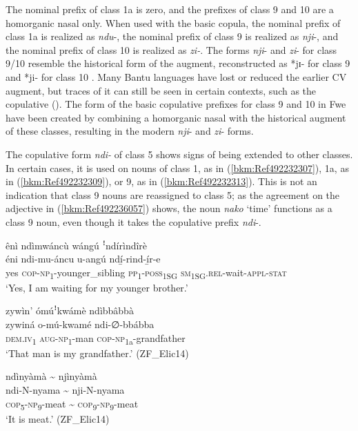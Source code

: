 The nominal prefix of class 1a is zero, and the prefixes of class 9 and 10 are a homorganic nasal only. When used with the basic copula, the nominal prefix of class 1a is realized as \textit{ndu}\nobreakdash-, the nominal prefix of class 9 is realized as \textit{nji}\nobreakdash-, and the nominal prefix of class 10 is realized as \textit{zi-}. The forms \textit{nji}\nobreakdash- and \textit{zi}\nobreakdash- for class 9/10 resemble the historical form of the augment, reconstructed as *jɪ\nobreakdash- for class 9 and *ji\nobreakdash- for class 10 \citep[99]{Meeussen1967}. Many Bantu languages have lost or reduced the earlier CV augment, but traces of it can still be seen in certain contexts, such as the copulative (\citealt{Blois1970}). The form of the basic copulative prefixes for class 9 and 10 in Fwe have been created by combining a homorganic nasal with the historical augment of these classes, resulting in the modern \textit{nji}\nobreakdash- and \textit{zi}\nobreakdash- forms.

The copulative form \textit{ndi-} of class 5 shows signs of being extended to other classes. In certain cases, it is used on nouns of class 1, as in (\ref{bkm:Ref492232307}), 1a, as in (\ref{bkm:Ref492232309}), or 9, as in (\ref{bkm:Ref492232313}). This is not an indication that class 9 nouns are reassigned to class 5; as the agreement on the adjective in (\ref{bkm:Ref492236057}) shows, the noun \textit{nako} ‘time’ functions as a class 9 noun, even though it takes the copulative prefix \textit{ndi}\nobreakdash-.

\ea
\label{bkm:Ref492232307}
ênì ndìmwáncù wángú ꜝndírìndîrè\\
\gll éni  ndi-mu-áncu    u-angú  ndí̲-rind-í̲r-e\\
yes  \textsc{cop}-\textsc{np}\textsubscript{1}-younger\_sibling  \textsc{pp}\textsubscript{1}-\textsc{poss}\textsubscript{1SG}  \textsc{sm}\textsubscript{1SG}.\textsc{rel}-wait-\textsc{appl}-\textsc{stat}\\
\glt ‘Yes, I am waiting for my younger brother.’
\z

\ea
\label{bkm:Ref492232309}
zywìn’ ómúꜝkwámè ndìbbâbbà\\
\gll zywiná  o-mú-kwamé  ndi-∅-bbábba\\
\textsc{dem}.\textsc{iv}\textsubscript{1}  \textsc{aug}-\textsc{np}\textsubscript{1}-man  \textsc{cop}-\textsc{np}\textsubscript{1a}-grandfather\\
\glt ‘That man is my grandfather.’ (ZF\_Elic14)
\z

\ea
\label{bkm:Ref492232313}
ndìnyàmà {\textasciitilde} njìnyàmà\\
\gll ndi-N-nyama  {\textasciitilde}  nji-N-nyama\\
\textsc{cop}\textsubscript{5}-\textsc{np}\textsubscript{9}-meat  {\textasciitilde}   \textsc{cop}\textsubscript{9}-\textsc{np}\textsubscript{9}-meat\\
\glt ‘It is meat.’ (ZF\_Elic14)
\z

